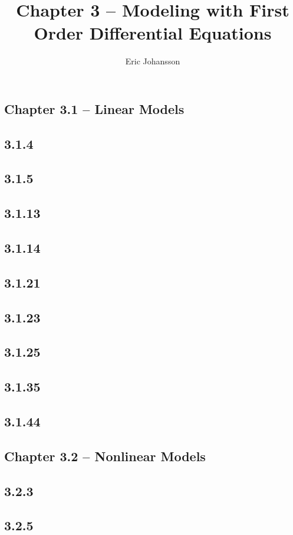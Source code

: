 \documentclass{article}
\title{Chapter 3 -- Modeling with First Order Differential Equations }
\author{Eric Johansson}
\begin{document}
\maketitle
\tableofcontents
\newpage

\subsection{Chapter 3.1 -- Linear Models}


\subsection{3.1.4}
\subsection{3.1.5}
\subsection{3.1.13}
\subsection{3.1.14}
\subsection{3.1.21}
\subsection{3.1.23}
\subsection{3.1.25}
\subsection{3.1.35}
\subsection{3.1.44}

    
\subsection{Chapter 3.2 -- Nonlinear Models}

\subsection{3.2.3}
\subsection{3.2.5}
\end{document}
